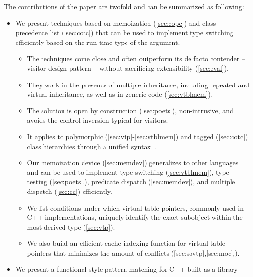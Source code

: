 The contributions of the paper are twofold and can be summarized as following:

\begin{itemize}
\setlength{\itemsep}{0pt}
\setlength{\parskip}{0pt}
\item We present techniques based on memoization (\textsection\ref{sec:copc}) and 
class precedence list (\textsection\ref{sec:cotc}) that can be used to implement 
type switching efficiently based on the run-time type of the argument.

  \begin{itemize}
  \setlength{\itemsep}{0pt}
  \setlength{\parskip}{0pt}
  \item The techniques come close and often outperform its de facto contender -- 
        visitor design pattern -- without sacrificing extensibility (\textsection\ref{sec:eval}).
  \item They work in the presence of multiple inheritance, including repeated and 
        virtual inheritance, as well as in generic code (\textsection\ref{sec:vtblmem}).
  \item The solution is open by construction (\textsection\ref{sec:poets}), 
        non-intrusive, and avoids the control inversion typical for visitors.
  \item It applies to polymorphic (\textsection\ref{sec:vtp}-\ref{sec:vtblmem}) and 
        tagged (\textsection\ref{sec:cotc}) class hierarchies through a unified  
        syntax~\cite{AP}.
  \item Our memoization device (\textsection\ref{sec:memdev}) generalizes to 
        other languages and can be used to implement type switching 
        (\textsection\ref{sec:vtblmem}), type testing 
        (\textsection\ref{sec:poets},\cite[]{TR}), predicate dispatch 
        (\textsection\ref{sec:memdev}), and multiple dispatch 
        (\textsection\ref{sec:cc}) efficiently.
  \item We list conditions under which virtual table pointers, commonly used in 
        C++ implementations, uniquely identify the exact subobject within the 
        most derived type (\textsection\ref{sec:vtp}).
  \item We also build an efficient cache indexing function for virtual table 
        pointers that minimizes the amount of conflicts 
        (\textsection\ref{sec:sovtp},\ref{sec:moc},\cite[.5]{TR}).
  \end{itemize}
\item We present a functional style pattern matching for C++ built as a library 

\end{itemize}
